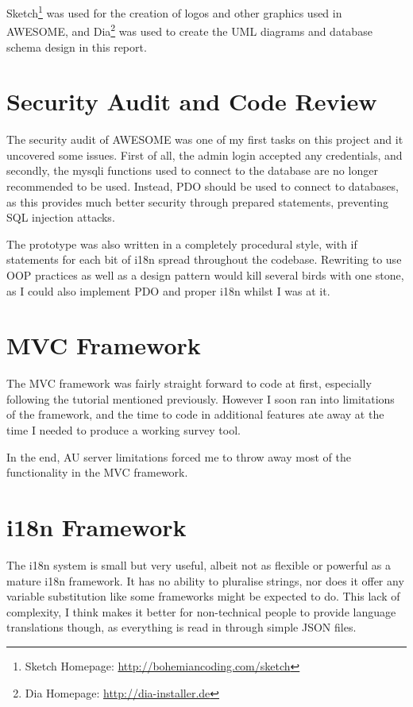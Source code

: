 	Sketch\footnote{Sketch Homepage: \url{http://bohemiancoding.com/sketch}} was used for the creation of logos and other graphics used in \ac{AWESOME}, and Dia\footnote{Dia Homepage: \url{http://dia-installer.de}} was used to create the \ac{UML} diagrams and database schema design in this report.
	
	\section{Security Audit and Code Review}
	\label{sec:securityauditimp}
	
	The security audit of \ac{AWESOME} was one of my first tasks on this project and it uncovered some issues.
	First of all, the admin login accepted any credentials, and secondly, the mysqli functions used to connect to the database are no longer recommended to be used.
	Instead, \ac{PDO} should be used to connect to databases, as this provides much better security through prepared statements, preventing SQL injection attacks.
	
	The prototype was also written in a completely procedural style, with if statements for each bit of \acl{i18n} spread throughout the codebase.
	Rewriting to use \ac{OOP} practices as well as a design pattern would kill several birds with one stone, as I could also implement \ac{PDO} and proper \ac{i18n} whilst I was at it.
	
	\section{\acl{MVC} Framework}
	\label{sec:mvcframeworkimp}
	
	The \acl{MVC} framework was fairly straight forward to code at first, especially following the tutorial mentioned previously\cite{php-mvc-tutorial}.
	However I soon ran into limitations of the framework, and the time to code in additional features ate away at the time I needed to produce a working survey tool.
	
	In the end, \ac{AU} server limitations forced me to throw away most of the functionality in the \ac{MVC} framework.
	
	\section{\acl{i18n} Framework}
	\label{sec:i18nframeworkimp}
	
	The \ac{i18n} system is small but very useful, albeit not as flexible or powerful as a mature \ac{i18n} framework.
	It has no ability to pluralise strings, nor does it offer any variable substitution like some frameworks might be expected to do.
	This lack of complexity, I think makes it better for non-technical people to provide language translations though, as everything is read in through simple JSON files.
	
